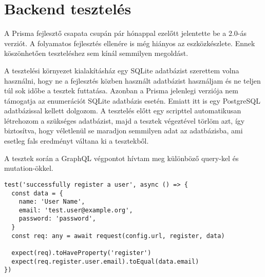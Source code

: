 \section{Backend tesztelés}
A Prisma fejlesztő csapata csupán pár hónappal ezelőtt jelentette be a 2.0-ás verziót.
A folyamatos fejlesztés ellenére is még hiányos az eszközkészlete.
Ennek köszönhetően teszteléshez sem kínál semmilyen megoldást.

A tesztelési környezet kialakításház egy SQLite adatbázist szerettem volna használni, hogy ne a fejlesztés közben használt adatbázist használjam és ne teljen túl sok időbe a tesztek futtatása.
Azonban a Prisma jelenlegi verziója nem támogatja az enumerációt SQLite adatbázis esetén.
Emiatt itt is egy PostgreSQL adatbázissal kellett dolgozom.
A tesztelés előtt egy scripttel automatikusan létrehozom a szükséges adatbázist, majd a tesztek végeztével törlöm azt, így biztosítva, hogy véletlenül se maradjon semmilyen adat az adatbázisba, ami esetleg fals eredményt váltana ki a tesztekből.

A tesztek során a GraphQL végpontot hívtam meg különböző query-kel és mutation-ökkel.


\begin{lstlisting}[style=ES6, caption=Regisztráció első teszt eset]    
test('successfully register a user', async () => {
  const data = {
    name: 'User Name',
    email: 'test.user@example.org',
    password: 'password',
  }
  const req: any = await request(config.url, register, data)

  expect(req).toHaveProperty('register')
  expect(req.register.user.email).toEqual(data.email)
})
\end{lstlisting}

